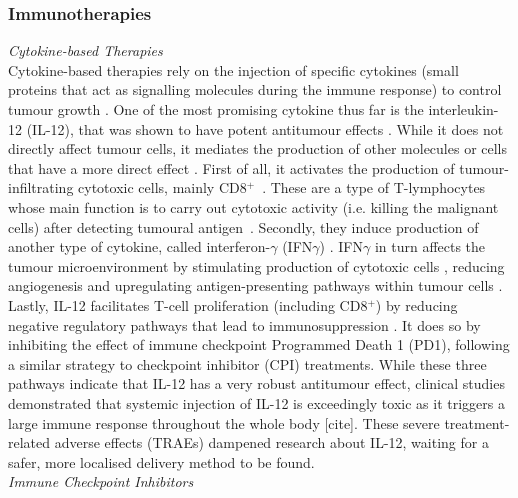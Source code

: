 \documentclass[11pt]{article}
\begin{document}
\subsubsection{Immunotherapies}
\textit{Cytokine-based Therapies}\\[3pt]
Cytokine-based therapies rely on the injection of specific cytokines (small proteins that act as signalling molecules during the immune response) to control tumour growth \cite{ioDef}. One of the most promising cytokine thus far is the interleukin-12 (IL-12), that was shown to have potent antitumour effects \cite{il12IsCool}. While it does not directly affect tumour cells, it mediates the production of other molecules or cells that have a more direct effect \cite{il12CytokineStorm}. First of all, it activates the production of tumour-infiltrating cytotoxic cells, mainly CD8$^+$~\cite{cd8FirstWay}. These are a type of T-lymphocytes whose main function is to carry out cytotoxic activity (i.e. killing the malignant cells) after detecting tumoural antigen~\cite{cd8Effects}. Secondly, they induce production of another type of cytokine, called interferon-$\gamma$ (IFN$\gamma$) \cite{ifnIL12}. IFN$\gamma$ in turn affects the tumour microenvironment by stimulating production of cytotoxic cells \cite{ifngNKProd}, reducing angiogenesis \cite{ifngAngiogenesis} and upregulating antigen-presenting pathways within tumour cells \cite{ifngAntigenExposure}. Lastly, IL-12 facilitates T-cell proliferation (including CD8$^+$) by reducing negative regulatory pathways that lead to immunosuppression \cite{reducImmunoSuppression}. It does so by inhibiting the effect of immune checkpoint Programmed Death 1 (PD1), following a similar strategy to checkpoint inhibitor (CPI) treatments. While these three pathways indicate that IL-12 has a very robust antitumour effect, clinical studies demonstrated that systemic injection of IL-12 is exceedingly toxic as it triggers a large immune response throughout the whole body [cite]. These severe treatment-related adverse effects (TRAEs) dampened research about IL-12, waiting for a safer, more localised delivery method to be found.\\[12pt]
%
\noindent\textit{Immune Checkpoint Inhibitors}\\[3pt]
\end{document}
